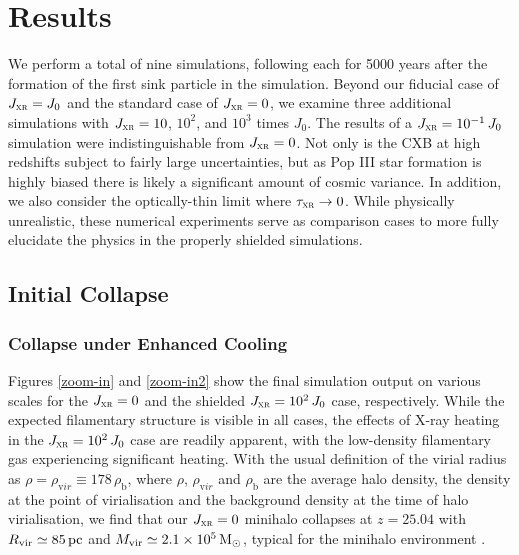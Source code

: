 \documentclass[../thesis.tex]{subfiles}
\begin{document}
\section{Results}
\label{xr_results}
We perform a total of nine simulations, following each for 5000 years after the formation of the first sink particle in the simulation.  Beyond our fiducial case of $J_{\textsc{xr}}=J_0$ and the standard case of $J_{\textsc{xr}}=0$, we examine three additional  simulations with $J_{\textsc{xr}} = 10$, $10^2$, and $10^3$ times $J_0$. The results of a $J_{\textsc{xr}} = 10^{-1}\,J_0$ simulation were indistinguishable from $J_{\textsc{xr}}=0$. Not only is the CXB at high redshifts subject to fairly large uncertainties, but as Pop III star formation is highly biased there is likely a significant amount of cosmic variance.
In addition, we also consider the optically-thin limit where $\tau_{\textsc{xr}} \rightarrow 0$.  While physically unrealistic, these numerical experiments serve as comparison cases to more fully elucidate the physics in the properly shielded simulations.

\subsection{Initial Collapse}
\label{collapse}
\subsubsection{Collapse under Enhanced Cooling}
\label{collapse_acceleration}
Figures \ref{zoom-in} and \ref{zoom-in2} show the final simulation output on various scales for the $J_{\textsc{xr}}=0$ and the shielded $J_{\textsc{xr}} = 10^2\,J_0$ case, respectively.  While the expected filamentary structure is visible in all cases, the effects of X-ray heating in the  $J_{\textsc{xr}} = 10^2\,J_0$ case are readily apparent, with the low-density filamentary gas  
experiencing significant heating. With the usual definition of the virial radius \rvir as $\rho = \rho_{\mathrm vir} \equiv 178\,\rho_{\mathrm b}$, where $\rho$, $\rho_{\mathrm vir}$ and $\rho_{\mathrm b}$ are the average halo density, the density at the point of virialisation and the background density at the time of halo virialisation, we find that our $J_{\textsc{xr}} = 0$ minihalo collapses at $z=25.04$ with ${R}_{\mathrm{vir}} \simeq 85\,\mathrm{pc}$ and ${M}_{\mathrm{vir}} \simeq 2.1\times10^5\,\mathrm{M}_{\odot}$, typical for the minihalo environment \citep{Bromm2013}.  
\end{document}
